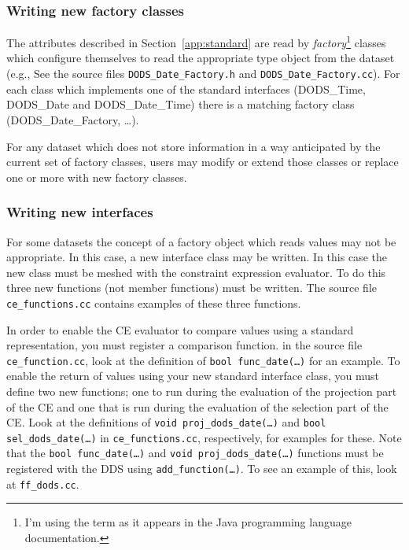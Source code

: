 \documentclass[12pt]{article}
\begin{document}
\subsubsection{Writing new factory classes}
\label{custopt2}

The attributes described in Section~\ref{app:standard} are read by
\emph{factory}\footnote{I'm using the term as it appears in the Java
  programming language documentation.} classes which configure themselves to
read the appropriate type object from the dataset (e.g., See the source files
{\tt DODS\_Date\_Factory.h} and {\tt DODS\_Date\_Factory.cc}). For each class
which implements one of the standard interfaces (DODS\_Time, DODS\_Date and
DODS\_Date\_Time) there is a matching factory class (DODS\_Date\_Factory,
\ldots).

For any dataset which does not store information in a way anticipated by the
current set of factory classes, users may modify or extend those classes or
replace one or more with new factory classes.

\subsubsection{Writing new interfaces}
\label{custopt3}

For some datasets the concept of a factory object which reads values may not
be appropriate. In this case, a new interface class may be written. In this
case the new class must be meshed with the constraint expression evaluator.
To do this three new functions (not member functions) must be written. The
source file {\tt ce\_functions.cc} contains examples of these three functions. 

In order to enable the CE evaluator to compare values using a standard
representation, you must register a comparison function. in the source file
{\tt ce\_function.cc}, look at the definition of {\tt bool func\_date(\ldots)}
for an example.  To enable the return of values using your new standard
interface class, you must define two new functions; one to run during the
evaluation of the projection part of the CE and one that is run during the
evaluation of the selection part of the CE. Look at the definitions of
{\tt void proj\_dods\_date(\ldots)} and {\tt bool sel\_dods\_date(\ldots)} in
{\tt ce\_functions.cc}, respectively, for examples for these. Note that the
{\tt bool func\_date(\ldots)} and {\tt void proj\_dods\_date(\ldots)} functions
must be registered with the DDS using {\tt add\_function(\ldots)}. To see an
example of this, look at {\tt ff\_dods.cc}.
\end{document}
